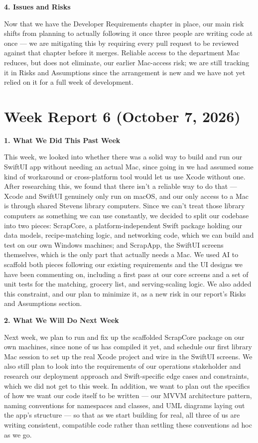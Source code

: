 \noindent\textbf{4. Issues and Risks}

Now that we have the Developer Requirements chapter in place, our main risk shifts from planning to actually following it once three people are writing code at once --- we are mitigating this by requiring every pull request to be reviewed against that chapter before it merges. Reliable access to the department Mac reduces, but does not eliminate, our earlier Mac-access risk; we are still tracking it in Risks and Assumptions since the arrangement is new and we have not yet relied on it for a full week of development.

\section{Week Report 6 (October 7, 2026)}

\noindent\textbf{1. What We Did This Past Week}

This week, we looked into whether there was a solid way to build and run our SwiftUI app without needing an actual Mac, since going in we had assumed some kind of workaround or cross-platform tool would let us use Xcode without one. After researching this, we found that there isn't a reliable way to do that --- Xcode and SwiftUI genuinely only run on macOS, and our only access to a Mac is through shared Stevens library computers. Since we can't treat those library computers as something we can use constantly, we decided to split our codebase into two pieces: ScrapCore, a platform-independent Swift package holding our data models, recipe-matching logic, and networking code, which we can build and test on our own Windows machines; and ScrapApp, the SwiftUI screens themselves, which is the only part that actually needs a Mac. We used AI to scaffold both pieces following our existing requirements and the UI designs we have been commenting on, including a first pass at our core screens and a set of unit tests for the matching, grocery list, and serving-scaling logic. We also added this constraint, and our plan to minimize it, as a new risk in our report's Risks and Assumptions section.

\noindent\textbf{2. What We Will Do Next Week}

Next week, we plan to run and fix up the scaffolded ScrapCore package on our own machines, since none of us has compiled it yet, and schedule our first library Mac session to set up the real Xcode project and wire in the SwiftUI screens. We also still plan to look into the requirements of our operations stakeholder and research our deployment approach and Swift-specific edge cases and constraints, which we did not get to this week. In addition, we want to plan out the specifics of how we want our code itself to be written --- our MVVM architecture pattern, naming conventions for namespaces and classes, and UML diagrams laying out the app's structure --- so that as we start building for real, all three of us are writing consistent, compatible code rather than settling these conventions ad hoc as we go.

